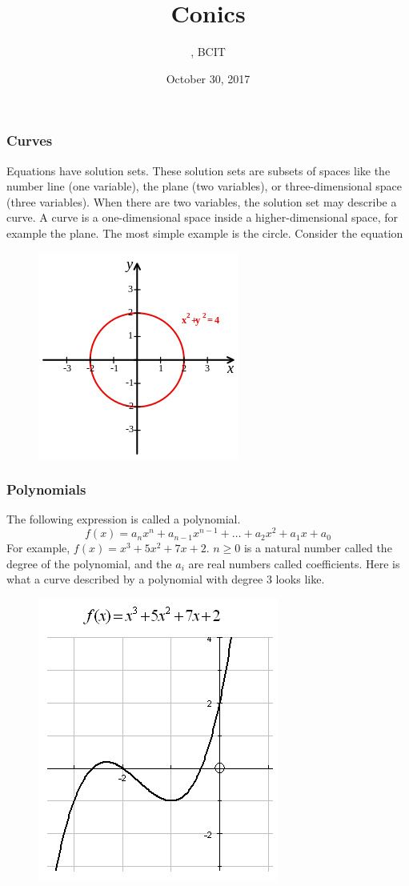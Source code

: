 \documentclass[xcolor=dvipsnames]{beamer}
\title{Conics}
\subtitle{{\CourseNumber}, BCIT}
\author{\CourseName}
\date{October 30, 2017}
\begin{document}
\begin{frame}
  \titlepage
\end{frame}

\begin{frame}
  \frametitle{Curves}
Equations have solution sets. These solution sets are subsets of
spaces like the number line (one variable), the plane (two variables),
or three-dimensional space (three variables). When there are two
variables, the solution set may describe a curve. A curve is a
one-dimensional space inside a higher-dimensional space, for example
the plane. The most simple example is the circle. Consider the
equation
  \begin{figure}[h]
    \includegraphics[scale=.5]{./circle.png}
  \end{figure}
\end{frame}

\begin{frame}
  \frametitle{Polynomials}
The following expression is called a polynomial.
\begin{equation}
  \label{eq:eeheemei}
f(x)=a_{n}x^{n}+a_{n-1}x^{n-1}+\ldots{}+a_{2}x^{2}+a_{1}x+a_{0}
\end{equation}
For example, $f(x)=x^{3}+5x^{2}+7x+2$. $n\geq{}0$ is a natural number
called the \alert{degree of the polynomial}, and the $a_{i}$ are real
numbers called \alert{coefficients}. Here is what a curve described by
a polynomial with degree $3$ looks like.
  \begin{figure}[h]
    \includegraphics[scale=.35]{./third.png}
  \end{figure}
\end{frame}
\end{document}
